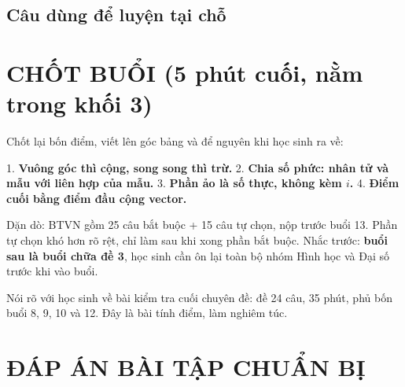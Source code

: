 \documentclass[11pt, a4paper]{article}
\begin{document}
\subsection{Câu dùng để luyện tại chỗ}


\section{CHỐT BUỔI (5 phút cuối, nằm trong khối 3)}

Chốt lại bốn điểm, viết lên góc bảng và để nguyên khi học sinh ra về:

1. \textbf{Vuông góc thì cộng, song song thì trừ.}
2. \textbf{Chia số phức: nhân tử và mẫu với liên hợp của mẫu.}
3. \textbf{Phần ảo là số thực, không kèm $i$.}
4. \textbf{Điểm cuối bằng điểm đầu cộng vector.}

Dặn dò: BTVN gồm 25 câu bắt buộc + 15 câu tự chọn, nộp trước buổi 13. Phần tự chọn khó hơn rõ rệt, chỉ làm sau khi xong phần bắt buộc. Nhắc trước: \textbf{buổi sau là buổi chữa đề 3}, học sinh cần ôn lại toàn bộ nhóm Hình học và Đại số trước khi vào buổi.

Nói rõ với học sinh về bài kiểm tra cuối chuyên đề: đề 24 câu, 35 phút, phủ bốn buổi 8, 9, 10 và 12. Đây là bài tính điểm, làm nghiêm túc.

\section{ĐÁP ÁN BÀI TẬP CHUẨN BỊ}
\end{document}
